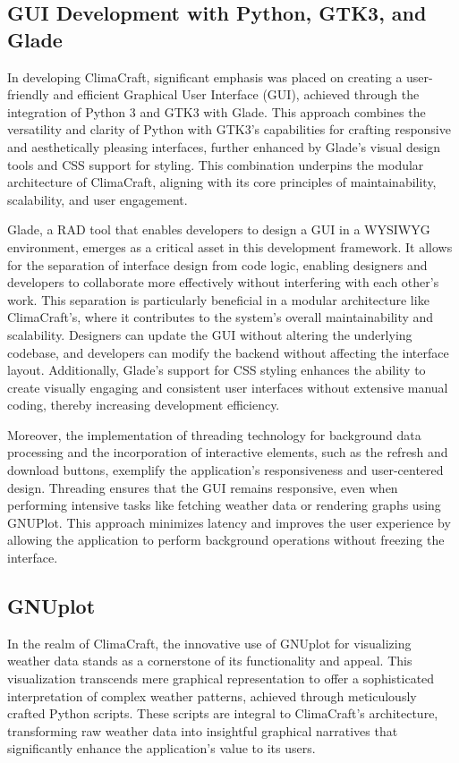 \documentclass[sn-mathphys-num]{sn-jnl}%
\begin{document}
\subsection{GUI Development with Python, GTK3, and Glade}\label{sec3.2}

In developing ClimaCraft, significant emphasis was placed on creating a user-friendly and efficient Graphical User Interface (GUI), achieved through the integration of Python 3 and GTK3 with Glade. This approach combines the versatility and clarity of Python with GTK3's capabilities for crafting responsive and aesthetically pleasing interfaces, further enhanced by Glade's visual design tools and CSS support for styling. This combination underpins the modular architecture of ClimaCraft, aligning with its core principles of maintainability, scalability, and user engagement.

Glade, a RAD tool that enables developers to design a GUI in a WYSIWYG environment, emerges as a critical asset in this development framework. It allows for the separation of interface design from code logic, enabling designers and developers to collaborate more effectively without interfering with each other's work. This separation is particularly beneficial in a modular architecture like ClimaCraft's, where it contributes to the system's overall maintainability and scalability. Designers can update the GUI without altering the underlying codebase, and developers can modify the backend without affecting the interface layout. Additionally, Glade's support for CSS styling enhances the ability to create visually engaging and consistent user interfaces without extensive manual coding, thereby increasing development efficiency.

Moreover, the implementation of threading technology for background data processing and the incorporation of interactive elements, such as the refresh and download buttons, exemplify the application's responsiveness and user-centered design. Threading ensures that the GUI remains responsive, even when performing intensive tasks like fetching weather data or rendering graphs using GNUPlot. This approach minimizes latency and improves the user experience by allowing the application to perform background operations without freezing the interface.

\subsection{GNUplot}\label{sec3.3}

In the realm of ClimaCraft, the innovative use of GNUplot for visualizing weather data stands as a cornerstone of its functionality and appeal. This visualization transcends mere graphical representation to offer a sophisticated interpretation of complex weather patterns, achieved through meticulously crafted Python scripts. These scripts are integral to ClimaCraft's architecture, transforming raw weather data into insightful graphical narratives that significantly enhance the application's value to its users.
\end{document}
